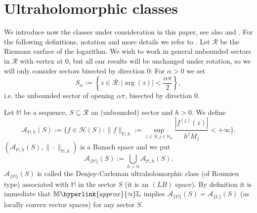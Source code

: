 \documentclass[11pt,a4paper]{article}
\theoremstyle{plain}
\theoremstyle{definition}
\newcommand{\NN}{\mathbb{N}}
\newcommand{\M}{\mathbb{M}}
\newcommand{\LL}{\mathbb{L}}
\begin{document}
\section{Ultraholomorphic classes}\label{sect.UltraholomClass}
We introduce now the classes under consideration in this paper, see also \cite[Sect. 2.5]{sectorialextensions} and \cite[Sect. 2.5]{sectorialextensions1}. For the following definitions, notation and more details we refer to \cite[Section 2]{Sanzflatultraholomorphic}. Let $\mathcal{R}$ be the Riemann surface of the logarithm. We wish to work in general unbounded sectors in $\mathcal{R}$ with vertex at $0$, but all our results will be unchanged under rotation, so we will only consider sectors bisected by direction $0$: For $\alpha>0$ we set \[S_{\alpha}:=\left\{z\in\mathcal{R}: |\arg(z)|<\frac{\alpha\pi}{2}\right\},\]
i.e. the unbounded sector of opening $\alpha\pi$, bisected by direction $0$.

Let $\M$ be a sequence, $S\subseteq\mathcal{R}$ an (unbounded) sector and $h>0$. We define
\[\mathcal{A}_{\M,h}(S):=\{f\in\mathcal{H}(S): \|f\|_{\M,h}:=\sup_{z\in S, j\in\NN_0}\frac{|f^{(j)}(z)|}{h^j M_j}<+\infty\}.\]
$(\mathcal{A}_{\M,h}(S),\|\cdot\|_{\M,h})$ is a Banach space and we put
\begin{equation*}%
	\mathcal{A}_{\{\M\}}(S):=\bigcup_{h>0}\mathcal{A}_{\M,h}(S).
\end{equation*}
$\mathcal{A}_{\{\M\}}(S)$ is called the Denjoy-Carleman ultraholomorphic class (of Roumieu type) associated with $\M$ in the sector $S$ (it is an $(LB)$ space). By definition it is immediate that $\M\hyperlink{approx}{\approx}\LL$ implies $\mathcal{A}_{\{\M\}}(S)=\mathcal{A}_{\{\LL\}}(S)$ (as locally convex vector spaces) for any sector $S$.
%
%
%
%

\vspace{6pt}
\end{document}
